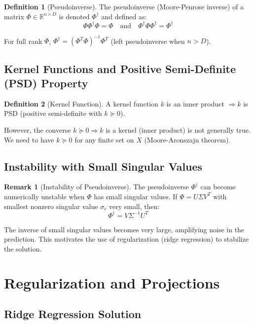 \documentclass[12pt,a4paper]{article}
\theoremstyle{definition}
\newtheorem{definition}{Definition}[section]
\newtheorem{remark}{Remark}[section]
\begin{document}
\begin{definition}[Pseudoinverse]
The pseudoinverse (Moore-Penrose inverse) of a matrix $\Phi \in \mathbb{R}^{n \times D}$ is denoted $\Phi^\dagger$ and defined as:
\[
\Phi \Phi^\dagger \Phi = \Phi \quad \text{and} \quad \Phi^\dagger \Phi \Phi^\dagger = \Phi^\dagger
\]

For full rank $\Phi$, $\Phi^\dagger = (\Phi^T \Phi)^{-1} \Phi^T$ (left pseudoinverse when $n > D$).
\end{definition}

\subsection{Kernel Functions and Positive Semi-Definite (PSD) Property}

\begin{definition}[Kernel Function]
A kernel function $k$ is an inner product $\Rightarrow k$ is PSD (positive semi-definite with $k \succeq 0$).

However, the converse $k \succeq 0 \Rightarrow k$ is a kernel (inner product) is not generally true. We need to have $k \succeq 0$ for any finite set on $X$ (Moore-Aronszajn theorem).
\end{definition}

\subsection{Instability with Small Singular Values}

\begin{remark}[Instability of Pseudoinverse]
The pseudoinverse $\Phi^\dagger$ can become numerically unstable when $\Phi$ has small singular values. If $\Phi = U\Sigma V^T$ with smallest nonzero singular value $\sigma_r$ very small, then:
\[
\Phi^\dagger = V\Sigma^{-1} U^T
\]

The inverse of small singular values becomes very large, amplifying noise in the prediction. This motivates the use of regularization (ridge regression) to stabilize the solution.
\end{remark}

\newpage


\section{Regularization and Projections}

\subsection{Ridge Regression Solution}
\end{document}
